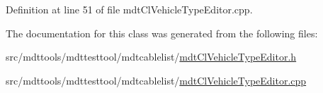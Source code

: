 Definition at line 51 of file mdt\-Cl\-Vehicle\-Type\-Editor.\-cpp.



The documentation for this class was generated from the following files\-:\begin{DoxyCompactItemize}
\item 
src/mdttools/mdttesttool/mdtcablelist/\hyperlink{mdt_cl_vehicle_type_editor_8h}{mdt\-Cl\-Vehicle\-Type\-Editor.\-h}\item 
src/mdttools/mdttesttool/mdtcablelist/\hyperlink{mdt_cl_vehicle_type_editor_8cpp}{mdt\-Cl\-Vehicle\-Type\-Editor.\-cpp}\end{DoxyCompactItemize}
